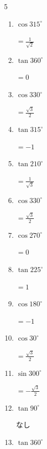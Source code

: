 \begin{multicols}{5}
\begin{enumerate}
  \item $\displaystyle \cos{315^\circ}$

        $\displaystyle =\frac{1}{\sqrt{2}}$

  \item $\displaystyle \tan{360^\circ}$

        $\displaystyle =0$

  \item $\displaystyle \cos{330^\circ}$

        $\displaystyle =\frac{\sqrt{3}}{2}$

\columnbreak %

\resetques

  \item $\displaystyle \tan{315^\circ}$

        $\displaystyle =-1$

  \item $\displaystyle \tan{210^\circ}$

        $\displaystyle =\frac{1}{\sqrt{3}}$

  \item $\displaystyle \cos{330^\circ}$

        $\displaystyle =\frac{\sqrt{3}}{2}$

  \item $\displaystyle \cos{270^\circ}$

        $\displaystyle =0$

  \item $\displaystyle \tan{225^\circ}$

        $\displaystyle =1$

  \item $\displaystyle \cos{180^\circ}$

        $\displaystyle =-1$

  \item $\displaystyle \cos{30^\circ}$

        $\displaystyle =\frac{\sqrt{3}}{2}$

  \item $\displaystyle \sin{300^\circ}$

        $\displaystyle =-\frac{\sqrt{3}}{2}$

  \item $\displaystyle \tan{90^\circ}$

        $\displaystyle なし$

  \item $\displaystyle \tan{360^\circ}$


\end{enumerate}
\end{multicols}
